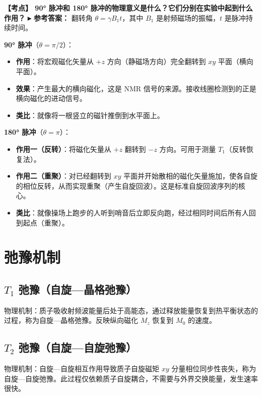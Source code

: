 \documentclass[12pt,a4paper]{article}
\newcommand{\exam}[1]{\textbf{\color{blue!70!black}【考点】#1}}
\newcommand{\answer}[1]{\vspace{2pt}\noindent\textbf{\color{teal!80!black}▸ 参考答案：}#1\vspace{4pt}}
\newcommand{\qa}[2]{\exam{#1}\answer{#2}}
\begin{document}
\qa{
    90° 脉冲和 180° 脉冲的物理意义是什么？它们分别在实验中起到什么作用？
}{
    翻转角 $\theta = \gamma B_1 t$，其中 $B_1$ 是射频磁场的振幅，$t$ 是脉冲持续时间。

    \textbf{90° 脉冲}（$\theta = \pi/2$）：
    \begin{itemize}
        \item \textbf{作用}：将宏观磁化矢量从 $+z$ 方向（静磁场方向）完全翻转到 $xy$ 平面（横向平面）。
        \item \textbf{效果}：产生最大的横向磁化，这是 NMR 信号的来源。接收线圈检测到的正是横向磁化的进动信号。
        \item \textbf{类比}：就像将一根竖立的磁针推倒到水平面上。
    \end{itemize}

    \textbf{180° 脉冲}（$\theta = \pi$）：
    \begin{itemize}
        \item \textbf{作用一（反转）}：将磁化矢量从 $+z$ 翻转到 $-z$ 方向。可用于测量 $T_1$（反转恢复法）。
        \item \textbf{作用二（重聚）}：对已经翻转到 $xy$ 平面并开始散相的磁化矢量施加，使各自旋的相位反转，从而实现重聚（产生自旋回波）。这是标准自旋回波序列的核心。
        \item \textbf{类比}：就像操场上跑步的人听到哨音后立即反向跑，经过相同时间后所有人回到起点（重聚）。
    \end{itemize}
}

\section{弛豫机制}

\subsection{\(T_1\) 弛豫（自旋—晶格弛豫）}
物理机制：质子吸收射频波能量后处于高能态，通过释放能量恢复到热平衡状态的过程，称为自旋—晶格弛豫。反映纵向磁化 \(M_z\) 恢复到 \(M_0\) 的速度。

\subsection{\(T_2\) 弛豫（自旋—自旋弛豫）}
物理机制：自旋—自旋相互作用导致质子自旋磁矩 \(xy\) 分量相位同步性丧失，称为自旋—自旋弛豫。此过程仅依赖质子自旋耦合，不需要与外界交换能量，发生速率很快。
\end{document}
